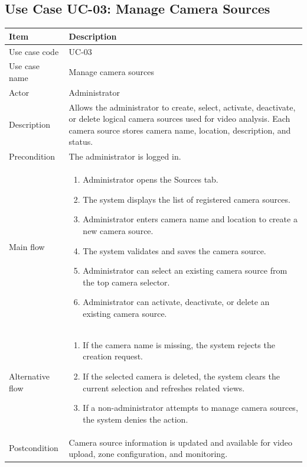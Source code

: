 \documentclass[12pt,a4paper]{report}
\begin{document}
\subsection{Use Case UC-03: Manage Camera Sources}
\begin{longtable}{|p{3.6cm}|p{10.4cm}|}
\hline
\rowcolor{HeaderBlue}\textbf{Item} & \textbf{Description} \\
\hline
Use case code & UC-03 \\
\hline
Use case name & Manage camera sources \\
\hline
Actor & Administrator \\
\hline
Description & Allows the administrator to create, select, activate, deactivate, or delete logical camera sources used for video analysis. Each camera source stores camera name, location, description, and status. \\
\hline
Precondition & The administrator is logged in. \\
\hline
Main flow &
\begin{enumerate}
    \item Administrator opens the Sources tab.
    \item The system displays the list of registered camera sources.
    \item Administrator enters camera name and location to create a new camera source.
    \item The system validates and saves the camera source.
    \item Administrator can select an existing camera source from the top camera selector.
    \item Administrator can activate, deactivate, or delete an existing camera source.
\end{enumerate} \\
\hline
Alternative flow &
\begin{enumerate}
    \item If the camera name is missing, the system rejects the creation request.
    \item If the selected camera is deleted, the system clears the current selection and refreshes related views.
    \item If a non-administrator attempts to manage camera sources, the system denies the action.
\end{enumerate} \\
\hline
Postcondition & Camera source information is updated and available for video upload, zone configuration, and monitoring. \\
\hline
\end{longtable}
\end{document}
